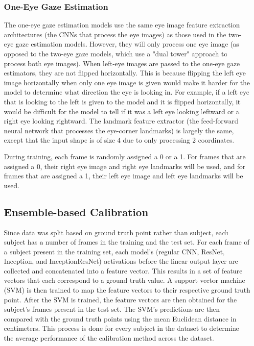 \documentclass{article}
\begin{document}
\subsubsection{One-Eye Gaze Estimation}
The one-eye gaze estimation models use the same eye image feature extraction architectures (the CNNs that process the eye images) as those used in the two-eye gaze estimation models. However, they will only process one eye image (as opposed to the two-eye gaze models, which use a "dual tower" approach to process both eye images). When left-eye images are passed to the one-eye gaze estimators, they are not flipped horizontally. This is because flipping the left eye image horizontally when only one eye image is given would make it harder for the model to determine what direction the eye is looking in. For example, if a left eye that is looking to the left is given to the model and it is flipped horizontally, it would be difficult for the model to tell if it was a left eye looking leftward or a right eye looking rightward. The landmark feature extractor (the feed-forward neural network that processes the eye-corner landmarks) is largely the same, except that the input shape is of size 4 due to only processing 2 coordinates.

During training, each frame is randomly assigned a 0 or a 1. For frames that are assigned a 0, their right eye image and right eye landmarks will be used, and for frames that are assigned a 1, their left eye image and left eye landmarks will be used.
\subsection{Ensemble-based Calibration}
Since data was split based on ground truth point rather than subject, each subject has a number of frames in the training and the test set. For each frame of a subject present in the training set, each model's (regular CNN, ResNet, Inception, and InceptionResNet) activations before the linear output layer are collected and concatenated into a feature vector. This results in a set of feature vectors that each correspond to a ground truth value. A support vector machine (SVM) is then trained to map the feature vectors to their respective ground truth point. After the SVM is trained, the feature vectors are then obtained for the subject's frames present in the test set. The SVM's predictions are then compared with the ground truth points using the mean Euclidean distance in centimeters. This process is done for every subject in the dataset to determine the average performance of the calibration method across the dataset.
\end{document}
